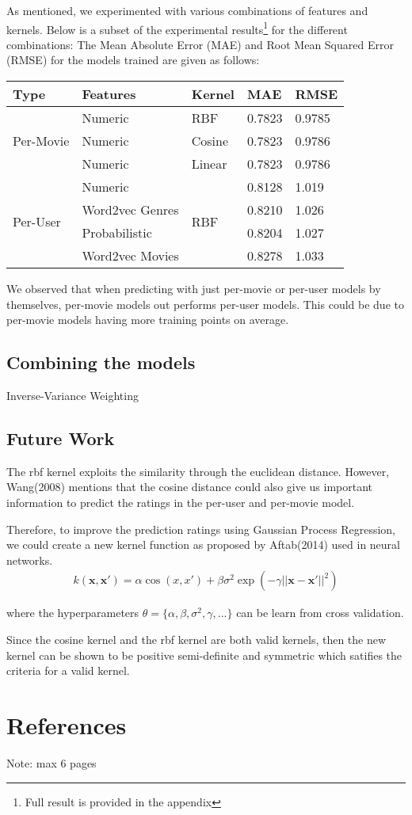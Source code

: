 \documentclass[letterpaper]{article}
\begin{document}
As mentioned, we experimented with various combinations of features and kernels. Below is a subset of the experimental results\footnote{Full result is provided in the appendix} for the different combinations:
The Mean Absolute Error (MAE) and Root Mean Squared Error (RMSE) for the models trained are given as follows:

\begin{center}
	\begin{tabular}{lllll}
		Type & Features & Kernel & MAE & RMSE \\
		\hline
		\multirow{3}{*}{Per-Movie}
		& Numeric & RBF & 0.7823 & 0.9785\\
		& Numeric & Cosine & 0.7823 & 0.9786 \\
		& Numeric & Linear & 0.7823 & 0.9786 \\
		\hline
		\multirow{4}{*}{Per-User} & Numeric & \multirow{4}{*}{RBF} & 0.8128 & 1.019 \\
		& Word2vec Genres & & 0.8210 & 1.026 \\
		& Probabilistic   & & 0.8204 & 1.027 \\
		& Word2vec Movies & & 0.8278 & 1.033 \\
	\end{tabular}
\end{center}
We observed that when predicting with just per-movie or per-user models by themselves, per-movie models out performs per-user models.
This could be due to per-movie models having more training points on average.
\subsection{Combining the models}

Inverse-Variance Weighting

\subsection{Future Work}
The rbf kernel exploits the similarity through the euclidean distance. However, Wang(2008) mentions that the cosine distance could also give us important information to predict the ratings in the per-user and per-movie model.

Therefore, to improve the prediction ratings using Gaussian Process Regression, we could create a new kernel function as proposed by Aftab(2014) used in neural networks.
\begin{align*}
	k (\textbf{x},\textbf{x}') = 
	\alpha \cos(x,x') + 
	\beta\sigma^2\exp(-\gamma||\mathbf{x} - \mathbf{x}'||^{2})
\end{align*}

where the hyperparameters $\theta = \lbrace \alpha, \beta, \sigma^{2}, \gamma, ...\rbrace$ can be learn from cross validation.  

Since the cosine kernel and the rbf kernel are both valid kernels, then the new kernel can be shown to be positive semi-definite and symmetric which satifies the criteria for a valid kernel.

\section{References}
Note: max 6 pages
\end{document}
